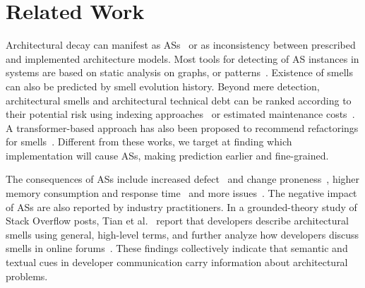 \section{Related Work}
\label{s:rw}

Architectural decay can manifest as \aclp{AS}~\cite{as_catalog} or as inconsistency between prescribed and implemented architecture models\cite{ghorbani_2024,ghorbani_2019}.
Most tools for detecting of \acl{AS} instances in systems are based on static analysis on graphs\cite{fontana_2017, tommasel_2022,garcia_2022,martini_architectural_2020,bakhtin_leveraging_2025,mo_2021}, or patterns~\cite{ntentos_2023}. 
Existence of smells can also be predicted by smell evolution history\cite{garcia_2022,arcelli_fontana_study_2019}.
Beyond mere detection, architectural smells and architectural technical debt can be ranked according to their potential risk using indexing approaches~\cite{diaz-pace_2020,sas_ArchitecturalTechnical_2023,verdecchia_2020} or estimated maintenance costs~\cite{xiao_detecting_2022}.
A transformer-based approach has also been proposed to recommend refactorings for smells~\cite{nursapa_rose_2025}.
Different from these works, we target at finding which implementation will cause \aclp{AS}, making prediction earlier and fine-grained.

The consequences of \aclp{AS} include increased defect~\cite{tamburri_architecture_2023,mo_hotspot_2015} and change proneness~\cite{aversano_2020,sas_2022_relation,sas_2020},  higher memory consumption and response time~\cite{arcelli_fontana_impact_2023} and more issues~\cite{le_2018}.
The negative impact of \aclp{AS} are also reported by industry practitioners\cite{sas_2022_evolution,sas_perception_2021}.
In a grounded-theory study of Stack Overflow posts, Tian et al.~\cite{tian_2020} report that developers describe architectural smells using general, high-level terms, and further analyze how developers discuss smells in online forums~\cite{tian_2019}.
These findings collectively indicate that semantic and textual cues in developer communication carry information about architectural problems.

